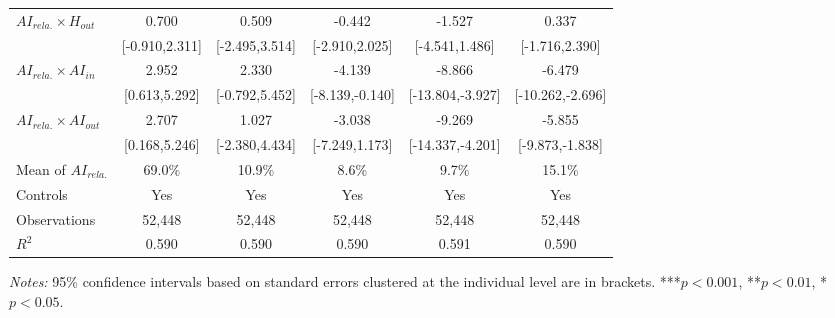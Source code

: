 \begin{table}[htbp]
\begin{threeparttable}
\begin{tabular}{l*{5}{c}}
\addlinespace
$AI_{rela.} \times H_{out}$&                 0.700         &                 0.509         &                -0.442         &                -1.527         &                 0.337         \\
            &        [-0.910,2.311]         &        [-2.495,3.514]         &        [-2.910,2.025]         &        [-4.541,1.486]         &        [-1.716,2.390]         \\
\addlinespace
$AI_{rela.} \times AI_{in}$&                 2.952\sym{*}  &                 2.330         &                -4.139\sym{*}  &                -8.866\sym{***}&                -6.479\sym{***}\\
            &         [0.613,5.292]         &        [-0.792,5.452]         &       [-8.139,-0.140]         &      [-13.804,-3.927]         &      [-10.262,-2.696]         \\
\addlinespace
$AI_{rela.} \times AI_{out}$&                 2.707\sym{*}  &                 1.027         &                -3.038         &                -9.269\sym{***}&                -5.855\sym{**} \\
            &         [0.168,5.246]         &        [-2.380,4.434]         &        [-7.249,1.173]         &      [-14.337,-4.201]         &       [-9.873,-1.838]         \\
\midrule
Mean of $AI_{rela.}$&                69.0\%         &                10.9\%         &                 8.6\%         &                 9.7\%         &                15.1\%         \\
Controls    &                   Yes         &                   Yes         &                   Yes         &                   Yes         &                   Yes         \\
Observations&                52,448         &                52,448         &                52,448         &                52,448         &                52,448         \\
$R^2$       &                 0.590         &                 0.590         &                 0.590         &                 0.591         &                 0.590         \\
\bottomrule\bottomrule
\end{tabular}
\begin{tablenotes}
\scriptsize
\item \textit{Notes:} 95\% confidence intervals based on standard errors clustered at the individual level are in brackets. ***$p<0.001$, **$p<0.01$, *$p<0.05$.
\end{tablenotes}
\end{threeparttable}
\end{table}

